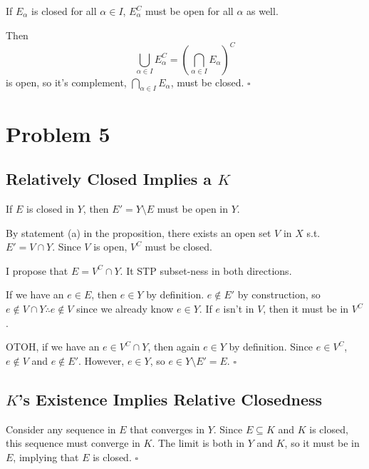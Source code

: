 \documentclass[12pt]{article}
\begin{document}
If $E_\alpha$ is closed for all $\alpha \in I$, $E_\alpha^C$ must be open for all $\alpha$ as well.

Then
\[\bigcup_{\alpha \in I} E_\alpha^C=\left(\bigcap_{\alpha \in I} E_\alpha\right)^C\]
is open, so it's complement, $\bigcap_{\alpha \in I} E_\alpha$, must be closed. $\square$

\section{Problem 5}

\subsection{Relatively Closed Implies a \texorpdfstring{$K$}{K}}

If $E$ is closed in $Y$, then $E'=Y \setminus E$ must be open in $Y$.

By statement (a) in the proposition, there exists an open set $V$ in $X$ s.t. $E'=V \cap Y$.
Since $V$ is open, $V^C$ must be closed.

I propose that $E=V^C \cap Y$.
It STP subset-ness in both directions.

If we have an $e \in E$, then $e \in Y$ by definition.
$e \notin E'$ by construction, so $e \notin V \cap Y \therefore e \notin V$
since we already know $e \in Y$.
If $e$ isn't in $V$, then it must be in $V^C$.

OTOH, if we have an $e \in V^C \cap Y$, then again $e \in Y$ by definition.
Since $e \in V^C$, $e \notin V$ and $e \notin E'$.
However, $e \in Y$, so $e \in Y \setminus E' = E$. $\square$

\subsection{\texorpdfstring{$K$}{K}'s Existence Implies Relative Closedness}

Consider any sequence in $E$ that converges in $Y$.
Since $E \subseteq K$ and $K$ is closed, this sequence must converge in $K$.
The limit is both in $Y$ and $K$, so it must be in $E$, implying that $E$ is closed. $\square$
\end{document}
